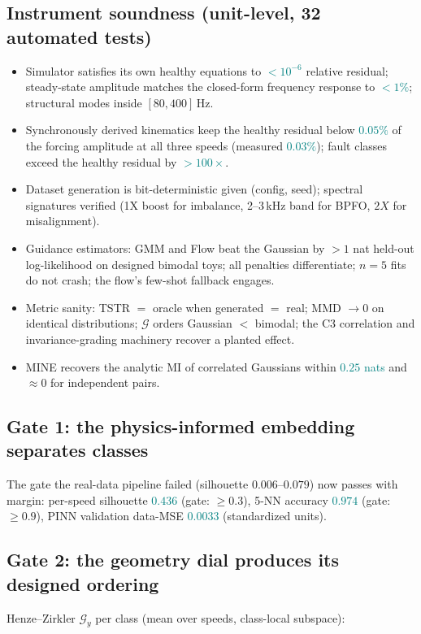 \documentclass[11pt]{article}
\newcommand{\Gng}{\mathcal{G}}
\newcommand{\measured}[1]{\textcolor{teal}{#1}}
\begin{document}
\subsection{Instrument soundness (unit-level, 32 automated tests)}
\begin{itemize}[leftmargin=1.6em,itemsep=1pt]
\item Simulator satisfies its own healthy equations to \measured{$<10^{-6}$}
relative residual; steady-state amplitude matches the closed-form frequency
response to \measured{$<1\%$}; structural modes inside $[80,400]$\,Hz.
\item Synchronously derived kinematics keep the healthy residual below
\measured{$0.05\%$} of the forcing amplitude at all three speeds
(measured \measured{$0.03\%$}); fault classes exceed the healthy residual by
\measured{$>100\times$}.
\item Dataset generation is bit-deterministic given (config, seed); spectral
signatures verified (1X boost for imbalance, 2--3\,kHz band for BPFO, $2X$
for misalignment).
\item Guidance estimators: GMM and Flow beat the Gaussian by $>1$ nat
held-out log-likelihood on designed bimodal toys; all penalties
differentiate; $n=5$ fits do not crash; the flow's few-shot fallback engages.
\item Metric sanity: TSTR $=$ oracle when generated $=$ real; MMD $\to 0$ on
identical distributions; $\Gng$ orders Gaussian $<$ bimodal; the C3
correlation and invariance-grading machinery recover a planted effect.
\item MINE recovers the analytic MI of correlated Gaussians within
\measured{$0.25$ nats} and $\approx 0$ for independent pairs.
\end{itemize}

\subsection{Gate 1: the physics-informed embedding separates classes}
The gate the real-data pipeline failed (silhouette $0.006$--$0.079$) now
passes with margin: per-speed silhouette \measured{$0.436$} (gate: $\ge
0.3$), 5-NN accuracy \measured{$0.974$} (gate: $\ge 0.9$), PINN validation
data-MSE \measured{$0.0033$} (standardized units).

\subsection{Gate 2: the geometry dial produces its designed ordering}
Henze--Zirkler $\Gng_y$ per class (mean over speeds, class-local subspace):
\end{document}
